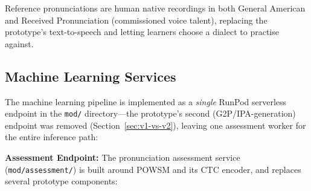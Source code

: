 \documentclass[a4paper,12pt]{report}
\begin{document}
Reference pronunciations are human native recordings in both General American and Received Pronunciation (commissioned voice talent), replacing the prototype's text-to-speech and letting learners choose a dialect to practise against.

\subsection{Machine Learning Services}

The machine learning pipeline is implemented as a \emph{single} RunPod serverless endpoint in the \texttt{mod/} directory---the prototype's second (G2P/IPA-generation) endpoint was removed (Section~\ref{sec:v1-vs-v2}), leaving one assessment worker for the entire inference path:

\textbf{Assessment Endpoint:} The pronunciation assessment service (\texttt{mod/assessment/}) is built around POWSM \cite{powsm} and its CTC encoder, and replaces several prototype components:
\end{document}

